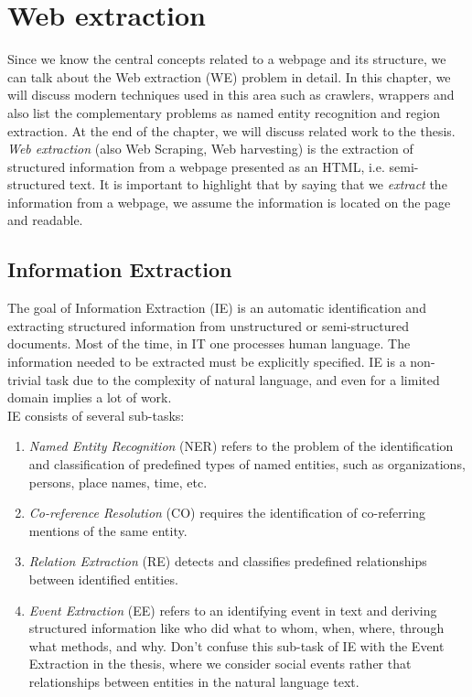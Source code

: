 \chapter{Web extraction}
\label{chap:webextr}
Since we know the central concepts related to a webpage and its structure, we can talk about the Web extraction (WE) problem in detail. In this chapter, we will discuss modern techniques used in this area such as crawlers, wrappers and also list the complementary problems as named entity recognition and region extraction. At the end of the chapter, we will discuss related work to the thesis.\\

\textit{Web extraction} (also Web Scraping, Web harvesting) is the extraction of structured information from a webpage presented as an HTML, i.e. semi-structured text. It is important to highlight that by saying that we \textit{extract} the information from a webpage, we assume the information is located on the page and readable.


\section{Information Extraction}

The goal of Information Extraction (IE) is an automatic identification and extracting structured information from unstructured or semi-structured documents. Most of the time, in IT one processes human language. The information needed to be extracted must be explicitly specified. IE is a non-trivial task due to the complexity of natural language, and even for a limited domain implies a lot of work.\\

IE consists of several sub-tasks\cite{InfExtr}:

\begin{enumerate}
    \item \textit{Named Entity Recognition} (NER) refers to the problem of the identification and classification of predefined types of named entities, such as organizations, persons, place names, time, etc.
    \item \textit{Co-reference Resolution} (CO) requires the identification of co-referring mentions of the same entity.
    \item \textit{Relation Extraction} (RE) detects and classifies predefined relationships between identified entities.
    \item \textit{Event Extraction} (EE) refers to an identifying event in text and deriving structured information like who did what to whom, when, where, through what methods, and why. Don't confuse this sub-task of IE with the Event Extraction in the thesis, where we consider social events rather that relationships between entities in the natural language text. 
\end{enumerate}

